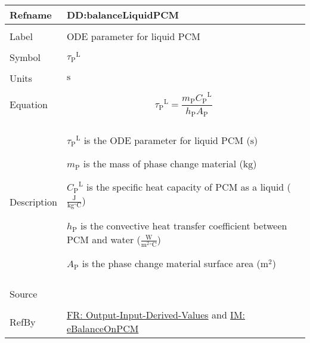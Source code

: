 \documentclass[12pt]{article}
\begin{document}
\vspace{\baselineskip}
\noindent
\begin{minipage}{\textwidth}
\begin{tabular}{>{\raggedright}p{}>{\raggedright\arraybackslash}p{}}
\toprule \textbf{Refname} & \textbf{DD:balanceLiquidPCM}
\label{DD:balanceLiquidPCM}
\\ \midrule \\
Label & ODE parameter for liquid PCM
        
\\ \midrule \\
Symbol & ${{τ_{\text{P}}}^{\text{L}}}$
         
\\ \midrule \\
Units & ${\text{s}}$
        
\\ \midrule \\
Equation & \begin{displaymath}
           {{τ_{\text{P}}}^{\text{L}}}=\frac{{m_{\text{P}}} {{C_{\text{P}}}^{\text{L}}}}{{h_{\text{P}}} {A_{\text{P}}}}
           \end{displaymath}
\\ \midrule \\
Description & \begin{symbDescription}
              \item{${{τ_{\text{P}}}^{\text{L}}}$ is the ODE parameter for liquid PCM (${\text{s}}$)}
              \item{${m_{\text{P}}}$ is the mass of phase change material (${\text{kg}}$)}
              \item{${{C_{\text{P}}}^{\text{L}}}$ is the specific heat capacity of PCM as a liquid ($\frac{\text{J}}{\text{kg}{}^{\circ}\text{C}}$)}
              \item{${h_{\text{P}}}$ is the convective heat transfer coefficient between PCM and water ($\frac{\text{W}}{\text{m}^{2}{}^{\circ}\text{C}}$)}
              \item{${A_{\text{P}}}$ is the phase change material surface area (${\text{m}^{2}}$)}
              \end{symbDescription}
\\ \midrule \\
Source & \cite{lightstone2012}
         
\\ \midrule \\
RefBy & \hyperref[outputInputDerivVals]{FR: Output-Input-Derived-Values} and \hyperref[IM:eBalanceOnPCM]{IM: eBalanceOnPCM}
        
\\ \bottomrule
\end{tabular}
\end{minipage}
\end{document}
